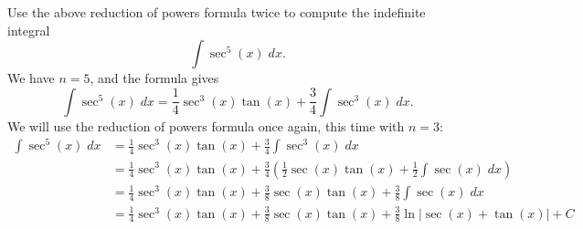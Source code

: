 \documentclass{ximera}
\begin{document}
\begin{example}
Use the above reduction of powers formula twice to compute the indefinite integral
\[
\int \sec^5(x) \; dx.
\]
We have $n =5$, and the formula gives
\[
\int \sec^5(x) \; dx = \frac14 \sec^3(x)\tan(x) + \frac34 \int \sec^3(x) \; dx.
\]
We will use the reduction of powers formula once again, this time with $n=3$:
\begin{align*}
\int \sec^5(x) \; dx &= \frac14 \sec^3(x)\tan(x) + \frac34 \int \sec^3(x) \; dx\\
&= \frac14 \sec^3(x)\tan(x) + \frac34\left(\frac12\sec(x)\tan(x) + \frac12\int \sec(x) \; dx\right)\\
&=\frac14 \sec^3(x)\tan(x) + \frac38\sec(x)\tan(x) + \frac38 \int \sec(x) \; dx \\
&=\frac14 \sec^3(x)\tan(x) + \frac38\sec(x)\tan(x) + \frac38\ln|\sec(x) + \tan(x)| + C
\end{align*}
\end{example}








\begin{center}
\begin{foldable}
\end{foldable}
\end{center}
\end{document}
